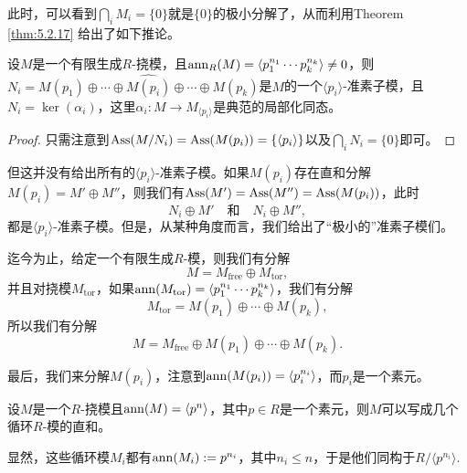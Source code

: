 此时，可以看到$\bigcap_i M_i=\{0\}$就是$\{0\}$的极小分解了，从而利用Theorem \ref{thm:5.2.17} 给出了如下推论。

\begin{coro}
设$M$是一个有限生成$R$-挠模，且$\operatorname{ann}_R(M)=\langle p_1^{n_1}\cdots p_k^{n_k}\rangle \neq 0$，则$N_i=M(p_1)\oplus \cdots \oplus \widehat{M(p_i)}\oplus \cdots  \oplus M(p_k)$是$M$的一个$\langle p_i\rangle$-准素子模，且$N_i=\ker(\alpha_i)$，这里$\alpha_i:M\to M_{\langle p_i\rangle}$是典范的局部化同态。
\end{coro}

\begin{proof}
    只需注意到$\operatorname{Ass}(M/N_i)=\operatorname{Ass}(M(p_i))=\{\langle p_i\rangle\}$以及$\bigcap_i N_i=\{0\}$即可。
\end{proof}

但这并没有给出所有的$\langle p_i\rangle$-准素子模。如果$M(p_i)$存在直和分解$M(p_i)=M'\oplus M''$，则我们有$\operatorname{Ass}(M')=\operatorname{Ass}(M'')=\operatorname{Ass}(M(p_i))$，此时
\[
    N_i\oplus M'\quad \text{和}\quad  N_i\oplus M'',
\]
都是$\langle p_i\rangle$-准素子模。但是，从某种角度而言，我们给出了“极小的”准素子模们。

\begin{para}
迄今为止，给定一个有限生成$R$-模，则我们有分解
\[
    M=M_{\mathrm{free}}\oplus M_{\mathrm{tor}},
\]
并且对挠模$M_{\mathrm{tor}}$，如果$\operatorname{ann}(M_{\mathrm{tor}})=\langle p_1^{n_1}\cdots p_k^{n_k}\rangle$，我们有分解
\[
    M_{\mathrm{tor}}=M(p_1)\oplus \cdots  \oplus M(p_k),
\]
所以我们有分解
\[
    M=M_{\mathrm{free}}\oplus M(p_1)\oplus \cdots  \oplus M(p_k).
\]
\end{para}

最后，我们来分解$M(p_i)$，注意到$\operatorname{ann}(M(p_i))=\langle p_i^{n_i}\rangle$，而$p_i$是一个素元。

\begin{pro}
设$M$是一个$R$-挠模且$\operatorname{ann}(M)=\langle p^n\rangle$，其中$p\in R$是一个素元，则$M$可以写成几个循环$R$-模的直和。
\end{pro}

显然，这些循环模$M_i$都有$\operatorname{ann}(M_i):=p^{n_i}$，其中$n_i\leq n$，于是他们同构于$R/\langle p^{n_i}\rangle$.

